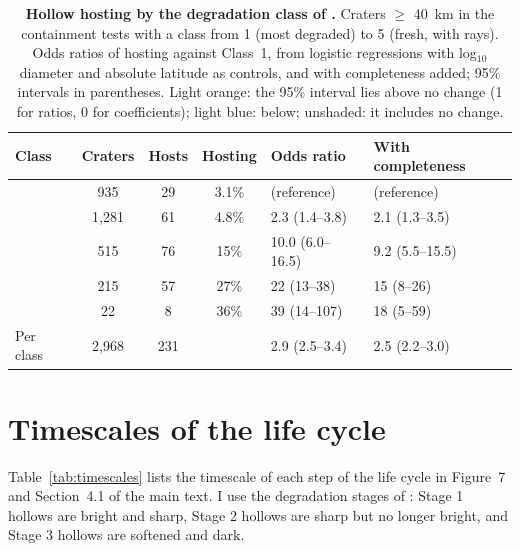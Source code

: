 \documentclass{planetary}
\begin{document}
\begin{table}[!ht]
    \mytablestyle
    \caption{{\bf Hollow hosting by the degradation class of \textcite{kinczykMorphologicalEvaluationCrater2020}.} Craters $\geq$ 40~km in the containment tests with a class from 1 (most degraded) to 5 (fresh, with rays). Odds ratios of hosting against Class~1, from logistic regressions with log$_{10}$ diameter and absolute latitude as controls, and with completeness added; 95\% intervals in parentheses. Light orange: the 95\% interval lies above no change (1 for ratios, 0 for coefficients); light blue: below; unshaded: it includes no change.}
    \footnotesize{
        \begin{tabularx}{\textwidth}{>{\raggedright\arraybackslash}X c c c >{\raggedright\arraybackslash}p{3.0cm} >{\raggedright\arraybackslash}p{3.0cm}}
            \toprule
            \textbf{Class} & \textbf{Craters} & \textbf{Hosts} & \textbf{Hosting} & \textbf{Odds ratio} & \textbf{With completeness} \\
            \hline
            1 & 935 & 29 & 3.1\% & 1 (reference) & 1 (reference) \\
            2 & 1,281 & 61 & 4.8\% & \cellcolor[HTML]{FBE3D6}2.3 (1.4--3.8) & \cellcolor[HTML]{FBE3D6}2.1 (1.3--3.5) \\
            3 & 515 & 76 & 15\% & \cellcolor[HTML]{FBE3D6}10.0 (6.0--16.5) & \cellcolor[HTML]{FBE3D6}9.2 (5.5--15.5) \\
            4 & 215 & 57 & 27\% & \cellcolor[HTML]{FBE3D6}22 (13--38) & \cellcolor[HTML]{FBE3D6}15 (8--26) \\
            5 & 22 & 8 & 36\% & \cellcolor[HTML]{FBE3D6}39 (14--107) & \cellcolor[HTML]{FBE3D6}18 (5--59) \\
            Per class & 2,968 & 231 & & \cellcolor[HTML]{FBE3D6}2.9 (2.5--3.4) & \cellcolor[HTML]{FBE3D6}2.5 (2.2--3.0) \\
            \hline
        \end{tabularx}}
    \label{tab:kinczyk}
\end{table}

\clearpage

\section{Timescales of the life cycle}
\label{sec:timescalesS}

Table~\ref{tab:timescales} lists the timescale of each step of the life cycle in Figure~7 and Section~4.1 of the main text. I use the degradation stages of \textcite{deutsch2025}: Stage 1 hollows are bright and sharp, Stage 2 hollows are sharp but no longer bright, and Stage 3 hollows are softened and dark.
\end{document}
